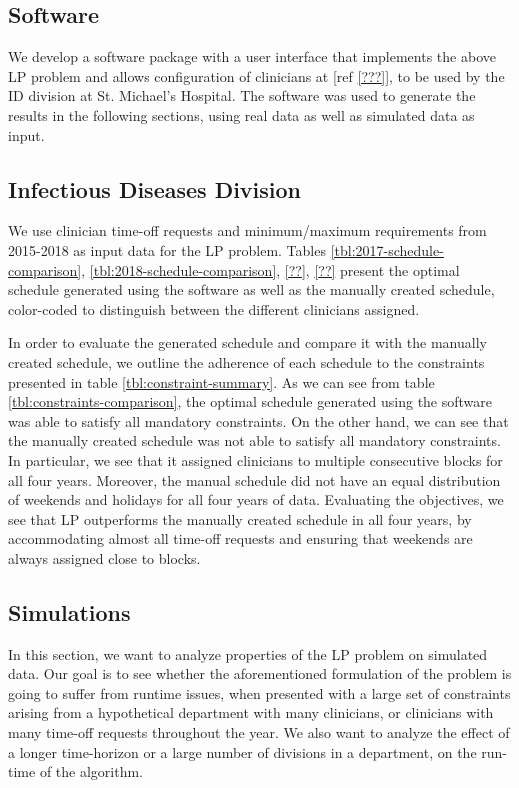 \subsection{Software}
We develop a software package with a user interface that implements the above LP problem and allows configuration of clinicians at [ref \ref{???}], to be used by the ID division at St. Michael's Hospital. The software was used to generate the results in the following sections, using real data as well as simulated data as input.

\subsection{Infectious Diseases Division}
We use clinician time-off requests and minimum/maximum requirements from 2015-2018 as input data for the LP problem. Tables \ref{tbl:2017-schedule-comparison}, \ref{tbl:2018-schedule-comparison}, \ref{??}, \ref{??} present the optimal schedule generated using the software as well as the manually created schedule, color-coded to distinguish between the different clinicians assigned.




In order to evaluate the generated schedule and compare it with the manually created schedule, we outline the adherence of each schedule to the constraints presented in table \ref{tbl:constraint-summary}. As we can see from table \ref{tbl:constraints-comparison}, the optimal schedule generated using the software was able to satisfy all mandatory constraints. On the other hand, we can see that the manually created schedule was not able to satisfy all mandatory constraints. In particular, we see that it assigned clinicians to multiple consecutive blocks for all four years. Moreover, the manual schedule did not have an equal distribution of weekends and holidays for all four years of data. Evaluating the objectives, we see that LP outperforms the manually created schedule in all four years, by accommodating almost all time-off requests and ensuring that weekends are always assigned close to blocks.



\subsection{Simulations}
In this section, we want to analyze properties of the LP problem on simulated data. Our goal is to see whether the aforementioned formulation of the problem is going to suffer from runtime issues, when presented with a large set of constraints arising from a hypothetical department with many clinicians, or clinicians with many time-off requests throughout the year. We also want to analyze the effect of a longer time-horizon or a large number of divisions in a department, on the run-time of the algorithm. \\

